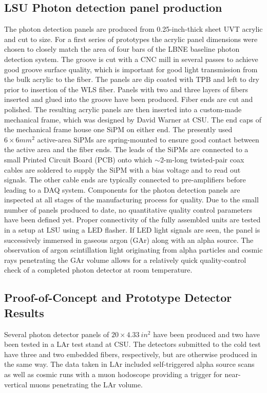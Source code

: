 \subsection{LSU Photon detection panel production}

The photon detection panels are produced from 0.25-inch-thick sheet
UVT acrylic and cut to size. For a first series of prototypes the
acrylic panel dimensions were chosen to closely match the area of four
bars of the LBNE baseline  photon detection system.
The groove is cut with a CNC mill in several passes to achieve good
groove surface quality, which is important for good light transmission
from the bulk acrylic to the fiber. The panels are dip coated with TPB
and left to dry prior to insertion of the WLS fiber. Panels with two
and three layers of fibers inserted and glued into the groove have
been produced. Fiber ends are cut and polished.  The resulting acrylic
panels are then inserted into a custom-made mechanical frame, which
was designed by David Warner at CSU.  The end caps of the mechanical
frame house one SiPM on either end. The presently used $6\times6 mm^2$
active-area SiPMs are spring-mounted to ensure good contact between
the active area and the fiber ends.  The leads of the SiPMs are
connected to a small Printed Circuit Board (PCB) onto which
$\sim$2-m-long twisted-pair coax cables are soldered to supply the
SiPM with a bias voltage and to read out signals. The other cable ends
are typically connected to pre-amplifiers before leading to a DAQ
system.  Components for the photon detection panels are inspected at
all stages of the manufacturing process for quality. Due to the small
number of panels produced to date, no quantitative quality control
parameters have been defined yet.  Proper connectivity of the fully
assembled units are tested in a setup at LSU using a LED flasher. If
LED light signals are seen, the panel is successively immersed in
gaseous argon (GAr) along with an alpha source. The observation of
argon scintillation light originating from alpha particles and cosmic
rays penetrating the GAr volume allows for a relatively quick
quality-control check of a completed photon detector at room
temperature.

\subsection{Proof-of-Concept and Prototype Detector Results}

Several photon detector panels of $20 \times 4.33~in^2$ have been
produced and two have been tested in a LAr test stand at CSU. The
detectors submitted to the cold test have three and two embedded fibers,
respectively, but are otherwise produced in the same way. The data
taken in LAr included self-triggered alpha source scans as well as
cosmic runs with a muon hodoscope providing a trigger for near-vertical muons penetrating the LAr volume.

